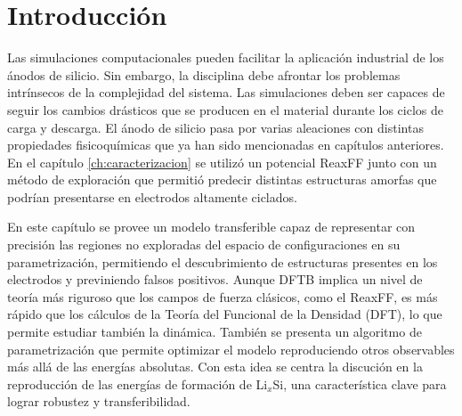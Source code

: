 \section{Introducción}

Las simulaciones computacionales pueden facilitar la aplicación industrial de los
ánodos de silicio. Sin embargo, la disciplina debe afrontar los problemas 
intrínsecos de la complejidad del sistema. Las simulaciones deben ser capaces
de seguir los cambios drásticos que se producen en el material durante los ciclos
de carga y descarga. El ánodo de silicio pasa por varias aleaciones con distintas
propiedades fisicoquímicas que ya han sido mencionadas en capítulos anteriores.
En el capítulo \ref{ch:caracterizacion} se utilizó un potencial ReaxFF 
\cite{fan2013} junto con un método de exploración que permitió predecir distintas
estructuras amorfas que podrían presentarse en electrodos altamente ciclados.

En este capítulo se provee un modelo transferible capaz de representar con 
precisión las regiones no exploradas del espacio de configuraciones en su 
parametrización, permitiendo el descubrimiento de estructuras presentes en los
electrodos y previniendo falsos positivos. Aunque DFTB implica un nivel de teoría
más riguroso que los campos de fuerza clásicos, como el ReaxFF, es más rápido que
los cálculos de la Teoría del Funcional de la Densidad (DFT), lo que permite 
estudiar también la dinámica. También se presenta un algoritmo de parametrización
que permite optimizar el modelo reproduciendo otros observables más allá de las
energías absolutas. Con esta idea se centra la discución en la reproducción de las
energías de formación de Li$_x$Si, una característica clave para lograr robustez
y transferibilidad. 
